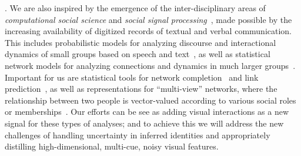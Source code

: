 
. We are also inspired by the emergence of the inter-disciplinary areas of \emph{computational social science} \cite{Lazer2009} and \emph{social signal processing}~\cite{Pantic}, made possible by the increasing availability of digitized records of textual and verbal communication. This includes probabilistic models for analyzing discourse and interactional dynamics of small groups based on speech and text~\cite{Basu:meeting,Dong,Choudhury:MHMM,Pan:influence,Grosz:1986,Moore:discoproc,Webber,GeeBook}, as well as statistical network models for analyzing connections and dynamics in much larger groups~\cite{Goldenberg,Kolacyzk,Snijders,Rossi}. Important for us are statistical tools for network completion~\cite{Clauset,Guimera,HannekeX09,KimL11} and link prediction~\cite{Goldberg,Liben-Nowell,TaskarWAK03}, as well as representations for ``multi-view'' networks, where the relationship between two people is vector-valued according to various social roles or memberships~\cite{AiroldiBFX08,Kim12}. 
Our efforts can be see as adding visual interactions as a new signal for these types of analyses; and to achieve this we will address the new challenges of handling uncertainty in inferred identities and appropriately distilling high-dimensional, multi-cue, noisy visual features.







